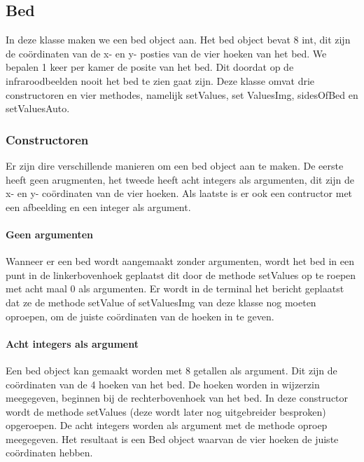 \subsection{Bed}
\label{mRefBed}
In deze klasse maken we een bed object aan. Het bed object bevat 8 int, dit zijn de co\"ordinaten van de x- en y- posties van de vier hoeken van het bed. We bepalen 1 keer per kamer de posite van het bed. Dit doordat op de infraroodbeelden nooit het bed te zien gaat zijn. Deze klasse omvat drie constructoren en vier methodes, namelijk setValues, set ValuesImg, sidesOfBed en setValuesAuto.

\subsubsection{Constructoren}
Er zijn dire verschillende manieren om een bed object aan te maken. De eerste heeft geen arugmenten, het tweede heeft acht integers als argumenten, dit zijn de x- en y- co\"ordinaten van de vier hoeken. Als laatste is er ook een contructor met een afbeelding en een integer als argument. 

\paragraph{Geen argumenten}
Wanneer er een bed wordt aangemaakt zonder argumenten, wordt het bed in een punt in de linkerbovenhoek geplaatst dit door de methode setValues op te roepen met acht maal 0 als argumenten. Er wordt in de terminal het bericht geplaatst dat ze de methode setValue of setValuesImg van deze klasse nog moeten oproepen, om de juiste co\"ordinaten van de hoeken in te geven. 

\paragraph{Acht integers als argument}
Een bed object kan gemaakt worden met 8 getallen als argument. Dit zijn de co\"ordinaten van de 4 hoeken van het bed. De hoeken worden in wijzerzin meegegeven, beginnen bij de rechterbovenhoek van het bed. In deze constructor wordt de methode setValues (deze wordt later nog uitgebreider besproken) opgeroepen. De acht integers worden als argument met de methode oproep meegegeven. Het resultaat is een Bed object waarvan de vier hoeken de juiste co\"ordinaten hebben.

